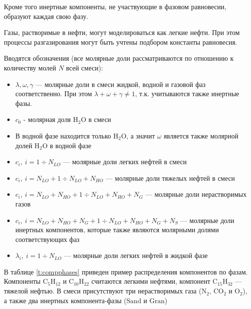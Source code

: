 ﻿\documentclass[12pt]{article}
\let\dividesymbol\div
\renewcommand{\div}{\operatorname{div}}
\begin{document}
Кроме того инертные компоненты, не участвующие в фазовом равновесии, образуют каждая свою фазу.

Газы, растворимые в нефти, могут моделироваться как легкие нефти. При этом процессы разгазирования могут быть учтены
подбором константы равновесия.

Вводятся обозначения (все молярные доли рассматриваются по отношению к количеству молей $N$ всей смеси):
\begin{itemize}
\item $\lambda, \omega, \gamma$ --- молярные доли в смеси жидкой, водной и газовой фаз соответственно. При этом
$\lambda + \omega + \gamma \ne 1$, т.к. учитываются также инертные фазы. \item $c_0$ - молярная доля $\mathrm{H_2O}$ в
смеси \item В водной фазе находится только $\mathrm{H_2O}$, а значит $\omega$ является также молярной долей
$\mathrm{H_2O}$ в водной фазе \item $c_i, \: i = 1 \dividesymbol N_{LO}$ --- молярные доли легких нефтей в смеси \item
$c_i, \: i = N_{LO} + 1 \dividesymbol N_{LO} + N_{HO}$ --- молярные доли тяжелых нефтей в смеси \item $c_i, \: i =
N_{LO} + N_{HO} + 1 \dividesymbol N_{LO} + N_{HO} + N_G$ --- молярные доли нерастворимых газов \item $c_i, \: i =
N_{LO} + N_{HO} + N_G + 1 \dividesymbol N_{LO} + N_{HO} + N_G + N_S$ --- молярные доли инертных компонентов, которые
также являются молярными долями соответствующих фаз \item $\lambda_i, \: i = 1 \dividesymbol N_{LO}$ --- молярные доли
легких нефтей в жидкой фазе

\end{itemize}

В таблице \ref{t:compphases} приведен пример распределения компонентов по фазам. Компоненты $\mathrm{C_5H_{12}}$ и
$\mathrm{C_{10}H_{22}}$ считаются легкими нефтями, компонент $\mathrm{C_{15}H_{32}}$ --- тяжелой нефтью. В смеси
присутствуют три нерастворимых газа ($\mathrm{N_2}$, $\mathrm{CO_2}$ и $\mathrm{O_2}$), а также два инертных
компонента-фазы ($\mathrm{Sand}$ и $\mathrm{Gran}$)
\end{document}
